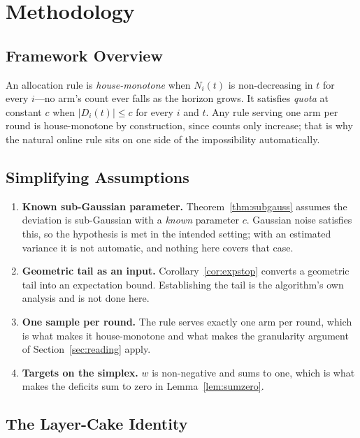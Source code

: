 \section{Methodology}
\label{sec:setting}

\subsection{Framework Overview}

An allocation rule is \emph{house-monotone} when $N_{i}(t)$ is non-decreasing in $t$ for every
$i$---no arm's count ever falls as the horizon grows. It satisfies \emph{quota} at constant
$c$ when $|D_{i}(t)|\le c$ for every $i$ and $t$. Any rule serving one arm per round is
house-monotone by construction, since counts only increase; that is why the natural online
rule sits on one side of the impossibility automatically.

\subsection{Simplifying Assumptions}

\begin{enumerate}
\item[1)] \textbf{Known sub-Gaussian parameter.} Theorem~\ref{thm:subgauss} assumes the
deviation is sub-Gaussian with a \emph{known} parameter $c$. Gaussian noise satisfies this, so
the hypothesis is met in the intended setting; with an estimated variance it is not automatic,
and nothing here covers that case.

\item[2)] \textbf{Geometric tail as an input.} Corollary~\ref{cor:expstop} converts a
geometric tail into an expectation bound. Establishing the tail is the algorithm's own
analysis and is not done here.

\item[3)] \textbf{One sample per round.} The rule serves exactly one arm per round, which is
what makes it house-monotone and what makes the granularity argument of
Section~\ref{sec:reading} apply.

\item[4)] \textbf{Targets on the simplex.} $w$ is non-negative and sums to one, which is what
makes the deficits sum to zero in Lemma~\ref{lem:sumzero}.
\end{enumerate}

\subsection{The Layer-Cake Identity}
\label{sec:layercake}

